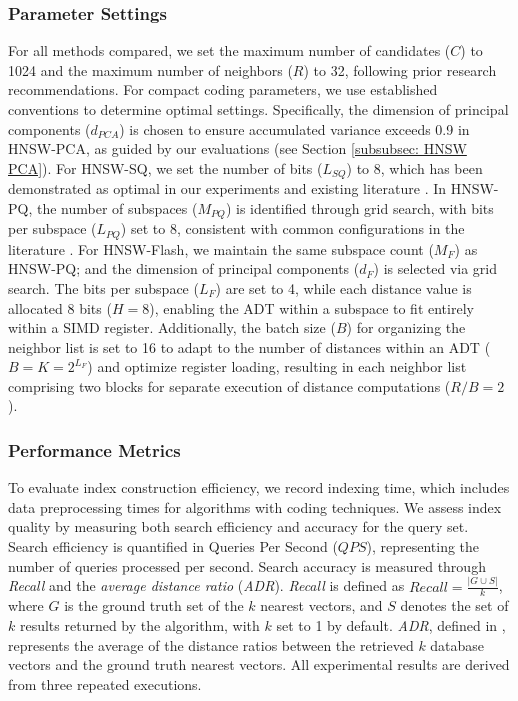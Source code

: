 \subsubsection{\textbf{Parameter Settings}}
\label{subsubsec: param set}
For all methods compared, we set the maximum number of candidates ($C$) to 1024 and the maximum number of neighbors ($R$) to 32, following prior research recommendations\cite{HVS}. For compact coding parameters, we use established conventions to determine optimal settings. Specifically, the dimension of principal components ($d_{PCA}$) is chosen to ensure accumulated variance exceeds 0.9 in HNSW-PCA, as guided by our evaluations (see Section \ref{subsubsec: HNSW PCA}). For HNSW-SQ, we set the number of bits ($L_{SQ}$) to 8, which has been demonstrated as optimal in our experiments and existing literature \cite{qdrant-sq,LeanVec}. In HNSW-PQ, the number of subspaces ($M_{PQ}$) is identified through grid search, with bits per subspace ($L_{PQ}$) set to 8, consistent with common configurations in the literature \cite{PQ,OPQ,ZhanM0GZM21,PQfast}. For HNSW-Flash, we maintain the same subspace count ($M_{F}$) as HNSW-PQ; and the dimension of principal components ($d_{F}$) is selected via grid search. The bits per subspace ($L_{F}$) are set to 4, while each distance value is allocated 8 bits ($H=8$), enabling the ADT within a subspace to fit entirely within a SIMD register. Additionally, the batch size ($B$) for organizing the neighbor list is set to 16 to adapt to the number of distances within an ADT ($B=K=2^{L_F}$) and optimize register loading, resulting in each neighbor list comprising two blocks for separate execution of distance computations ($R/B=2$).

\subsubsection{\textbf{Performance Metrics}}
\label{subsubsec: perf metrics}
To evaluate index construction efficiency, we record indexing time, which includes data preprocessing times for algorithms with coding techniques. We assess index quality by measuring both search efficiency and accuracy for the query set. Search efficiency is quantified in Queries Per Second ($QPS$), representing the number of queries processed per second. {Search accuracy is measured through \textit{Recall} and the \textit{average distance ratio} (\textit{ADR}).} \textit{Recall} is defined as $Recall=\frac{|G\cup S|}{k}$, where $G$ is the ground truth set of the $k$ nearest vectors, and $S$ denotes the set of $k$ results returned by the algorithm, with $k$ set to 1 by default. {\textit{ADR}, defined in \cite{PatellaC08,TaoYSK10}, represents the average of the distance ratios between the retrieved $k$ database vectors and the ground truth nearest vectors.} All experimental results are derived from three repeated executions.

